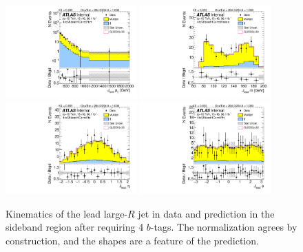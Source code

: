 \begin{figure}[htbp!]
\begin{center}
\includegraphics[width=0.45\textwidth,angle=-90]{figures/boosted/Sideband/b77_FourTag_Sideband_leadHCand_Pt_m_1.pdf}
\includegraphics[width=0.45\textwidth,angle=-90]{figures/boosted/Sideband/b77_FourTag_Sideband_leadHCand_Mass_s.pdf}\\
\includegraphics[width=0.45\textwidth,angle=-90]{figures/boosted/Sideband/b77_FourTag_Sideband_leadHCand_Eta.pdf}
\includegraphics[width=0.45\textwidth,angle=-90]{figures/boosted/Sideband/b77_FourTag_Sideband_leadHCand_Phi.pdf}
  \caption{Kinematics of the lead large-$R$ jet in data and prediction in the sideband region after requiring 4 $b$-tags. The normalization agrees by construction, and the shapes are a feature of the prediction.}
  \label{fig:boosted-4b-sideband-ak10-lead}
\end{center}
\end{figure}

